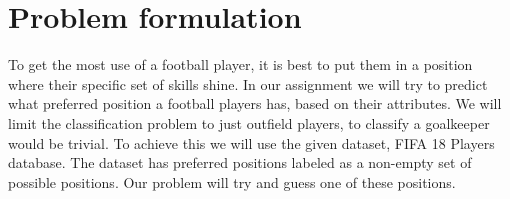 \section{Problem formulation}

To get the most use of a football player, it is best to put them in a position where their specific set of skills shine. In our assignment we will try to predict what preferred position a football players has, based on their attributes. We will limit the classification problem to just outfield players, to classify a goalkeeper would be trivial. To achieve this we will use the given dataset, FIFA 18 Players database. The dataset has preferred positions labeled as a non-empty set of possible positions. Our problem will try and guess one of these positions.